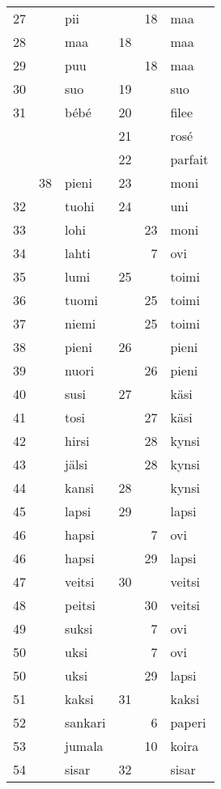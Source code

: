\begin{longtable}{@{}rrlrrl}
27 &    & pii       &    & 18 & maa \\
28 &    & maa       & 18 &    & maa \\
29 &    & puu       &    & 18 & maa \\
30 &    & suo       & 19 &    & suo \\
31 &    & bébé      & 20 &    & filee \\
   &    &           & 21 &    & rosé \\
   &    &           & 22 &    & parfait \\
   & 38 & pieni     & 23 &    & moni \\
32 &    & tuohi     & 24 &    & uni \\
33 &    & lohi      &    & 23 & moni \\
34 &    & lahti     &    &  7 & ovi \\
35 &    & lumi      & 25 &    & toimi \\
36 &    & tuomi     &    & 25 & toimi \\
37 &    & niemi     &    & 25 & toimi \\
38 &    & pieni     & 26 &    & pieni \\
39 &    & nuori     &    & 26 & pieni \\
40 &    & susi      & 27 &    & käsi \\
41 &    & tosi      &    & 27 & käsi \\
42 &    & hirsi     &    & 28 & kynsi \\
43 &    & jälsi     &    & 28 & kynsi \\
44 &    & kansi     & 28 &    & kynsi \\
45 &    & lapsi     & 29 &    & lapsi \\
46 &    & hapsi     &    &  7 & ovi \\
46 &    & hapsi     &    & 29 & lapsi \\
47 &    & veitsi    & 30 &    & veitsi \\
48 &    & peitsi    &    & 30 & veitsi \\
49 &    & suksi     &    &  7 & ovi \\
50 &    & uksi      &    &  7 & ovi \\
50 &    & uksi      &    & 29 & lapsi \\
51 &    & kaksi     & 31 &    & kaksi \\
52 &    & sankari   &    &  6 & paperi \\
53 &    & jumala    &    & 10 & koira \\
54 &    & sisar     & 32 &    & sisar \\

\end{longtable}
